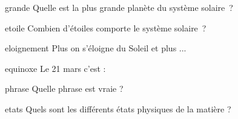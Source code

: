 \documentclass[a4paper]{article}
\begin{document}
{\begin{multicols}{2}
\begin{question}{grande}    
	Quelle est la plus grande planète du système solaire~?
	\begin{reponses}		
	\end{reponses}
\end{question}

\begin{question}{etoile}    
	Combien d'étoiles comporte le système solaire~?
	\begin{reponses}		
	\end{reponses}
\end{question}

\begin{question}{eloignement}    
	Plus on s'éloigne du Soleil et plus ...
	\begin{reponses}		
		
	\end{reponses}
\end{question}

\begin{question}{equinoxe}    
	Le 21 mars c'est :
	\begin{reponses}		
		
	\end{reponses}
\end{question}

\begin{question}{phrase}    
	Quelle phrase est vraie ?
	\begin{reponses}		
		
	\end{reponses}
\end{question}


\begin{question}{etats}
	Quels sont les différents états physiques de la matière ?
	\begin{reponses}
	\end{reponses}
\end{question}



\end{multicols}}
\end{document}

